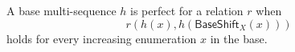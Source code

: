 \begin{definition}
A base multi-sequence $h$ is perfect for a relation $r$ when
\[
r(h(x),h(\mathsf{BaseShift}_X(x)))
\]
holds for every increasing enumeration $x$ in the base.
\end{definition}
